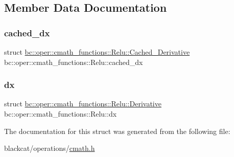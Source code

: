 \subsection{Member Data Documentation}
\mbox{\label{structbc_1_1oper_1_1cmath__functions_1_1Relu_aeaabe68960f04be06736b926b695d70c}} 
\subsubsection{\texorpdfstring{cached\+\_\+dx}{cached\_dx}}
{\footnotesize\ttfamily struct \hyperlink{structbc_1_1oper_1_1cmath__functions_1_1Relu_1_1Cached__Derivative}{bc\+::oper\+::cmath\+\_\+functions\+::\+Relu\+::\+Cached\+\_\+\+Derivative}   bc\+::oper\+::cmath\+\_\+functions\+::\+Relu\+::cached\+\_\+dx}

\mbox{\label{structbc_1_1oper_1_1cmath__functions_1_1Relu_aa3602950247d253df9eddadf6314bdb4}} 
\subsubsection{\texorpdfstring{dx}{dx}}
{\footnotesize\ttfamily struct \hyperlink{structbc_1_1oper_1_1cmath__functions_1_1Relu_1_1Derivative}{bc\+::oper\+::cmath\+\_\+functions\+::\+Relu\+::\+Derivative}   bc\+::oper\+::cmath\+\_\+functions\+::\+Relu\+::dx}



The documentation for this struct was generated from the following file\+:\begin{DoxyCompactItemize}
\item 
blackcat/operations/\hyperlink{cmath_8h}{cmath.\+h}\end{DoxyCompactItemize}
